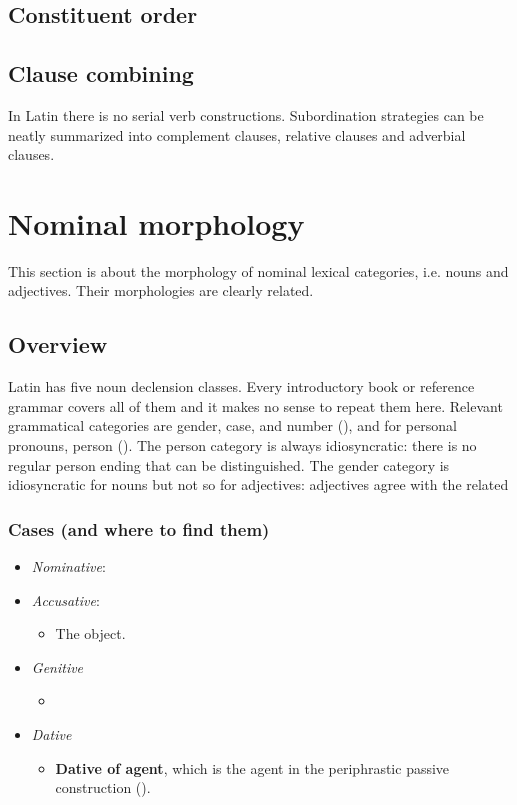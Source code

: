 \documentclass{article}
\newcommand*{\concept}[1]{\textbf{#1}}
\begin{document}
\subsection{Constituent order}\label{sec:constituent-order-abs}

\subsection{Clause combining}\label{sec:clause-combine-abs}

In Latin there is no serial verb constructions.
Subordination strategies can be neatly summarized into 
complement clauses, relative clauses and adverbial clauses.

\section{Nominal morphology}\label{sec:nominal-morphology}

This section is about the morphology of nominal lexical categories, i.e. nouns and adjectives.
Their morphologies are clearly related.

\subsection{Overview}

Latin has five noun declension classes.
Every introductory book or reference grammar covers all of them and it makes no sense to repeat them here.
Relevant grammatical categories are gender, case, and number (), 
and for personal pronouns, person ().
The person category is always idiosyncratic:
there is no regular person ending that can be distinguished.
The gender category is idiosyncratic for nouns but not so for adjectives:
adjectives agree with the related %

\subsubsection{Cases (and where to find them)}\label{sec:case}

\begin{itemize}
    \item \emph{Nominative}: %
    \item \emph{Accusative}: 
    \begin{itemize}
        \item The object.
    \end{itemize}
    \item \emph{Genitive}
    \begin{itemize}
        \item 
    \end{itemize}
    \item \emph{Dative}
    \begin{itemize}
        \item \concept{Dative of agent}, which is the agent in the periphrastic passive construction 
        (). 
    \end{itemize}
\end{itemize}
\end{document}
